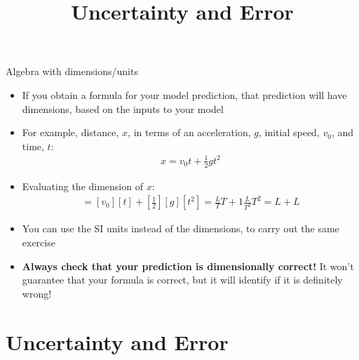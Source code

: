 \documentclass[aspectratio=169,
hyperref={colorlinks,urlcolor=blue}
]{beamer}
\begin{document}
\begin{frame}{Algebra with dimensions/units}
\begin{itemize}
\item If you obtain a formula for your model prediction, that prediction will have dimensions, based on the inputs to your model
\item For example, distance, $x$, in terms of an acceleration, $g$, initial speed, $v_0$, and time, $t$:
\begin{eqnarray}
x=v_0t+\frac{1}{2}gt^2
\end{eqnarray}
\item Evaluating the dimension of $x$:
\begin{eqnarray}
[x] = [v_0][t]+\left[\frac{1}{2}\right][g][t^2]=\frac{L}{T}T+1\frac{L}{T^2}T^2=L+L
\end{eqnarray}
\item You can use the SI units instead of the dimensions, to carry out the same exercise
\item \textbf{Always check that your prediction is dimensionally correct!} It won’t guarantee that your formula is correct, but it will identify if it is definitely wrong!
\end{itemize}

\end{frame}













\section{Uncertainty and Error}
\label{sec:uncertaintyanderror}
\title{Uncertainty and Error}


\begin{frame}
\titlepage
\thispagestyle{empty}
\end{frame}









\end{document}
